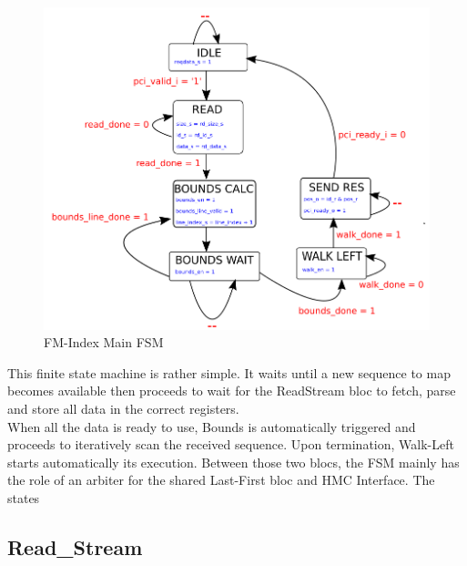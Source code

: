 \begin{minipage}[t]{0.45\textwidth}
\begin{figure}[H]
    \centering
    \hspace*{-25mm}\includegraphics[scale = 0.37]{Figures/FM_FSM.png}
    \caption{FM-Index Main FSM}
    \label{fig:fm_fsm}
\end{figure}
\end{minipage}
\hfill
\begin{minipage}[t]{0.4\textwidth}
This finite state machine is rather simple. It waits until a new sequence to map becomes available then proceeds to wait for the ReadStream bloc to fetch, parse and store all data in the correct registers. \\

When all the data is ready to use, Bounds is automatically triggered and proceeds to iteratively scan the received sequence. Upon termination, Walk-Left starts automatically its execution. Between those two blocs, the FSM mainly has the role of an arbiter for the shared Last-First bloc and HMC Interface. The states

\end{minipage}


\subsection{Read\_Stream}

